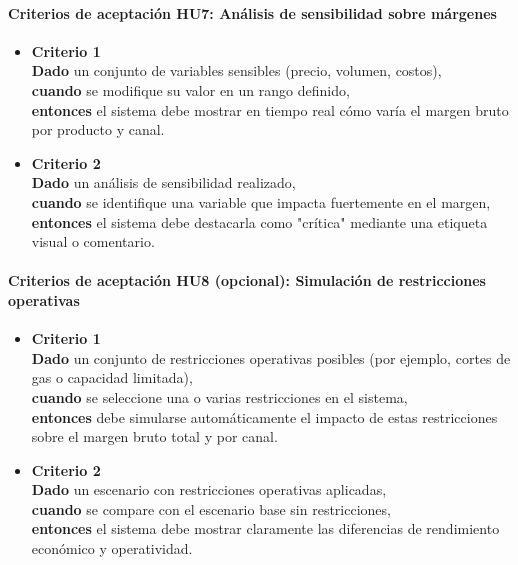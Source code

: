 \documentclass[
11pt, %
]{charter}
\begin{document}
\paragraph{Criterios de aceptación HU7: Análisis de sensibilidad sobre márgenes}
\begin{itemize}
  \item \textbf{Criterio 1} \\
  \textbf{Dado} un conjunto de variables sensibles (precio, volumen, costos), \\
  \textbf{cuando} se modifique su valor en un rango definido, \\
  \textbf{entonces} el sistema debe mostrar en tiempo real cómo varía el margen bruto por producto y canal.

  \item \textbf{Criterio 2} \\
  \textbf{Dado} un análisis de sensibilidad realizado, \\
  \textbf{cuando} se identifique una variable que impacta fuertemente en el margen, \\
  \textbf{entonces} el sistema debe destacarla como "crítica" mediante una etiqueta visual o comentario.
\end{itemize}

\vspace{1em}

\paragraph{Criterios de aceptación HU8 (opcional): Simulación de restricciones operativas}

\begin{itemize}
  \item \textbf{Criterio 1} \\
  \textbf{Dado} un conjunto de restricciones operativas posibles (por ejemplo, cortes de gas o capacidad limitada), \\
  \textbf{cuando} se seleccione una o varias restricciones en el sistema, \\
  \textbf{entonces} debe simularse automáticamente el impacto de estas restricciones sobre el margen bruto total y por canal.

  \item \textbf{Criterio 2} \\
  \textbf{Dado} un escenario con restricciones operativas aplicadas, \\
  \textbf{cuando} se compare con el escenario base sin restricciones, \\
  \textbf{entonces} el sistema debe mostrar claramente las diferencias de rendimiento económico y operatividad.
\end{itemize}
\end{document}
